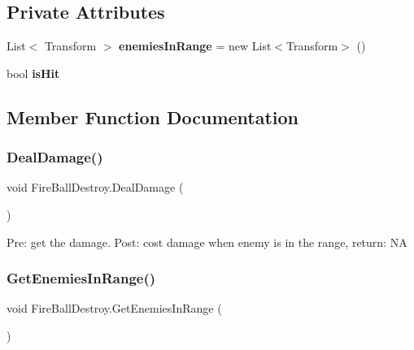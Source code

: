 \subsection*{Private Attributes}
\begin{DoxyCompactItemize}
\item 
\mbox{\label{class_fire_ball_destroy_a605873ae792e66b2b256273ceb435f4b}} 
List$<$ Transform $>$ {\bfseries enemies\+In\+Range} = new List$<$Transform$>$ ()
\item 
\mbox{\label{class_fire_ball_destroy_a774db2a9dba0a6554c77686deabb0729}} 
bool {\bfseries is\+Hit}
\end{DoxyCompactItemize}


\subsection{Member Function Documentation}
\mbox{\label{class_fire_ball_destroy_aebef1bc70ef5485396a840c7c38dfea5}} 
\subsubsection{\texorpdfstring{Deal\+Damage()}{DealDamage()}}
{\footnotesize\ttfamily void Fire\+Ball\+Destroy.\+Deal\+Damage (\begin{DoxyParamCaption}{ }\end{DoxyParamCaption})\hspace{0.3cm}{\ttfamily [private]}}

Pre\+: get the damage. Post\+: cost damage when enemy is in the range, return\+: NA \mbox{\label{class_fire_ball_destroy_a104f0b956151d400f8412b9c7cbacf19}} 
\subsubsection{\texorpdfstring{Get\+Enemies\+In\+Range()}{GetEnemiesInRange()}}
{\footnotesize\ttfamily void Fire\+Ball\+Destroy.\+Get\+Enemies\+In\+Range (\begin{DoxyParamCaption}{ }\end{DoxyParamCaption})\hspace{0.3cm}{\ttfamily [private]}}

